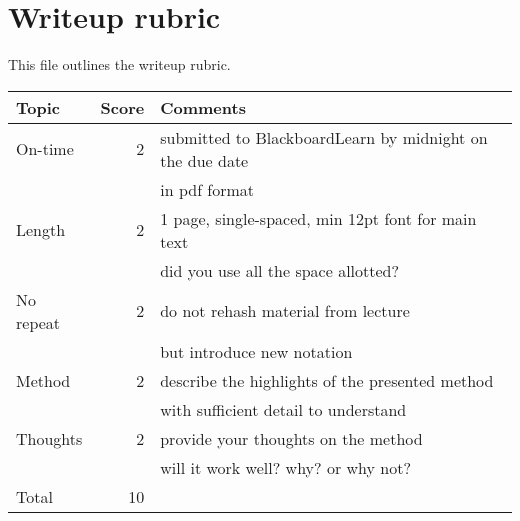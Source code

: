 \documentclass[10pt]{article}
\begin{document}
\chead[\fancyplain{} {}]   {\fancyplain{}{}}

\section*{Writeup rubric}

This file outlines the writeup rubric.

\begin{tabular}{|l|r|l|}
\hline
Topic & \multicolumn{1}{l|}{Score} & Comments \\
\hline
On-time   & 2 & submitted to BlackboardLearn by midnight on the due date \\
&& in pdf format \\
\hline
Length & 2 & 1 page, single-spaced, min 12pt font for main text \\ 
&& did you use all the space allotted? \\
\hline
No repeat   & 2 & do not rehash material from lecture \\
&& but introduce new notation \\
\hline
Method  & 2 & describe the highlights of the presented method \\
&& with sufficient detail to understand \\
\hline
Thoughts  & 2 & provide your thoughts on the method \\
&& will it work well? why? or why not? \\
\hline
Total &10 &\\
\hline
\end{tabular}
\end{document}
